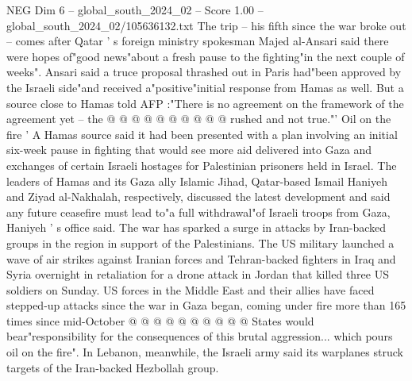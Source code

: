 \begin{textsample}{NEG Dim 6 – global\_south\_2024\_02 – Score 1.00 – global\_south\_2024\_02/105636132.txt}
The trip -- his fifth since the war broke out -- comes after Qatar ' s foreign ministry spokesman Majed al-Ansari said there were hopes of"good news"about a fresh pause to the fighting"in the next couple of weeks".
Ansari said a truce proposal thrashed out in Paris had"been approved by the Israeli side"and received a"positive"initial response from Hamas as well.
But a source close to Hamas told AFP :"There is no agreement on the framework of the agreement yet -- the @ @ @ @ @ @ @ @ @ @ rushed and not true."' Oil on the fire ' A Hamas source said it had been presented with a plan involving an initial six-week pause in fighting that would see more aid delivered into Gaza and exchanges of certain Israeli hostages for Palestinian prisoners held in Israel.
The leaders of Hamas and its Gaza ally Islamic Jihad, Qatar-based Ismail Haniyeh and Ziyad al-Nakhalah, respectively, discussed the latest development and said any future ceasefire must lead to"a full withdrawal"of Israeli troops from Gaza, Haniyeh ' s office said.
The war has sparked a surge in attacks by Iran-backed groups in the region in support of the Palestinians.
The US military launched a wave of air strikes against Iranian forces and Tehran-backed fighters in Iraq and Syria overnight in retaliation for a drone attack in Jordan that killed three US soldiers on Sunday.
US forces in the Middle East and their allies have faced stepped-up attacks since the war in Gaza began, coming under fire more than 165 times since mid-October @ @ @ @ @ @ @ @ @ @ States would bear"responsibility for the consequences of this brutal aggression... which pours oil on the fire".
In Lebanon, meanwhile, the Israeli army said its warplanes struck targets of the Iran-backed Hezbollah group.

\end{textsample}
